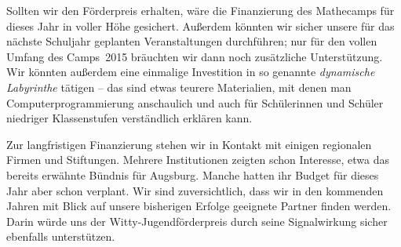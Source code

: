 \documentclass[12pt]{zettel}
\begin{document}
Sollten wir den Förderpreis erhalten, wäre die Finanzierung des Mathecamps für dieses Jahr in
voller Höhe gesichert. Außerdem könnten wir sicher unsere für das nächste Schuljahr
geplanten Veranstaltungen durchführen; nur für den vollen Umfang des
Camps~2015 bräuchten wir dann noch zusätzliche Unterstützung. Wir könnten außerdem
eine einmalige Investition in so genannte \emph{dynamische Labyrinthe} tätigen --
das sind etwas teurere Materialien, mit denen man
Computerprogrammierung anschaulich und auch für Schülerinnen und Schüler niedriger Klassenstufen
verständlich erklären kann.

Zur langfristigen Finanzierung stehen wir in Kontakt mit einigen regionalen Firmen und Stiftungen. Mehrere Institutionen zeigten schon Interesse, etwa das bereits erwähnte Bündnis für Augsburg. Manche hatten ihr Budget für dieses Jahr aber schon verplant. Wir sind zuversichtlich, dass wir in den kommenden Jahren mit Blick auf unsere bisherigen Erfolge geeignete Partner finden werden. Darin würde uns der Witty-Jugendförderpreis durch seine Signalwirkung sicher ebenfalls unterstützen.
\end{document}
